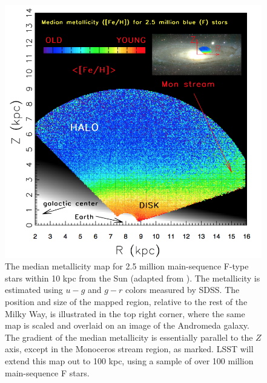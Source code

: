 \begin{figure}
\includegraphics[width=1.\hsize,clip]{panelsLSST.png}
\caption{
The median metallicity map for 2.5 million main-sequence F-type stars within 10 kpc
from the Sun (adapted from \cite{Ivezic2008a}). The metallicity is estimated using
$u-g$ and $g-r$ colors measured by SDSS. The position and size of the mapped
region, relative to the rest of the Milky Way, is illustrated in the top right
corner, where the same map is scaled and overlaid on an image of the Andromeda
galaxy. The gradient of the median metallicity is essentially parallel
to the $Z$ axis, except in the Monoceros stream region, as marked. LSST
will extend this map out to 100 kpc, using a sample of over 100 million
main-sequence F stars.}
\label{Fig:FeH3}
\end{figure}


